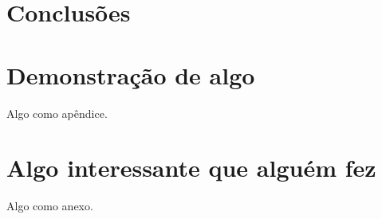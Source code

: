 \documentclass[oneside,openright,12pt]{ufsm_2015} %
\begin{document}

\chapter{Conclusões}
\label{sec:conclusao}





	
\apendice %

\chapter{Demonstração de algo}
\label{sec:apendice-demonst-algo}
        \par Algo como apêndice.  
        
\anexo    %

\chapter{Algo interessante que alguém fez}
\label{sec:anexo-algo-interessante}
         \par Algo como anexo.
\end{document}
